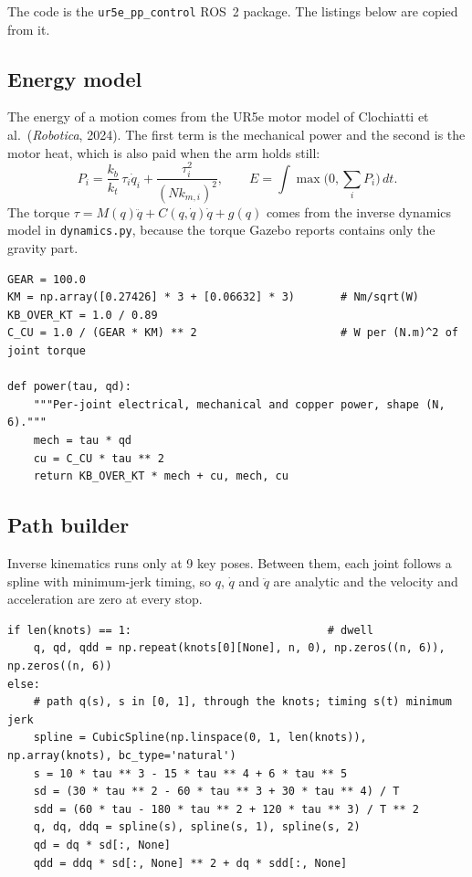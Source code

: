\documentclass[12pt,a4paper]{article}
\begin{document}
The code is the \texttt{ur5e\_pp\_control} ROS~2 package. The listings below are copied from it.

\subsection{Energy model}

The energy of a motion comes from the UR5e motor model of Clochiatti et al.\ (\textit{Robotica}, 2024). The first term is the mechanical power and the second is the motor heat, which is also paid when the arm holds still:
\begin{equation}
P_i = \frac{k_b}{k_t}\,\tau_i\dot q_i + \frac{\tau_i^2}{(N k_{m,i})^2},
\qquad
E = \int \max\Big(0, \sum_i P_i\Big)\,dt .
\end{equation}
The torque $\tau = M(q)\ddot q + C(q,\dot q)\dot q + g(q)$ comes from the inverse dynamics model in \texttt{dynamics.py}, because the torque Gazebo reports contains only the gravity part.

\begin{lstlisting}[caption={Motor constants and power (\texttt{validate.py})}]
GEAR = 100.0
KM = np.array([0.27426] * 3 + [0.06632] * 3)       # Nm/sqrt(W)
KB_OVER_KT = 1.0 / 0.89
C_CU = 1.0 / (GEAR * KM) ** 2                      # W per (N.m)^2 of joint torque

def power(tau, qd):
    """Per-joint electrical, mechanical and copper power, shape (N, 6)."""
    mech = tau * qd
    cu = C_CU * tau ** 2
    return KB_OVER_KT * mech + cu, mech, cu
\end{lstlisting}

\subsection{Path builder}

Inverse kinematics runs only at 9 key poses. Between them, each joint follows a spline with minimum-jerk timing, so $q$, $\dot q$ and $\ddot q$ are analytic and the velocity and acceleration are zero at every stop.

\begin{lstlisting}[caption={One move of the path (\texttt{energy\_opt.py}, \texttt{Planner.build})}]
if len(knots) == 1:                              # dwell
    q, qd, qdd = np.repeat(knots[0][None], n, 0), np.zeros((n, 6)), np.zeros((n, 6))
else:
    # path q(s), s in [0, 1], through the knots; timing s(t) minimum jerk
    spline = CubicSpline(np.linspace(0, 1, len(knots)), np.array(knots), bc_type='natural')
    s = 10 * tau ** 3 - 15 * tau ** 4 + 6 * tau ** 5
    sd = (30 * tau ** 2 - 60 * tau ** 3 + 30 * tau ** 4) / T
    sdd = (60 * tau - 180 * tau ** 2 + 120 * tau ** 3) / T ** 2
    q, dq, ddq = spline(s), spline(s, 1), spline(s, 2)
    qd = dq * sd[:, None]
    qdd = ddq * sd[:, None] ** 2 + dq * sdd[:, None]
\end{lstlisting}
\end{document}
